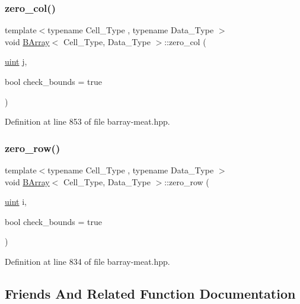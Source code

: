 \subsubsection{\texorpdfstring{zero\+\_\+col()}{zero\_col()}}
{\footnotesize\ttfamily template$<$typename Cell\+\_\+\+Type , typename Data\+\_\+\+Type $>$ \\
void \hyperlink{class_b_array}{B\+Array}$<$ Cell\+\_\+\+Type, Data\+\_\+\+Type $>$\+::zero\+\_\+col (\begin{DoxyParamCaption}\item[{\hyperlink{typedefs_8hpp_a91ad9478d81a7aaf2593e8d9c3d06a14}{uint}}]{j,  }\item[{bool}]{check\+\_\+bounds = {\ttfamily true} }\end{DoxyParamCaption})\hspace{0.3cm}{\ttfamily [inline]}}



Definition at line 853 of file barray-\/meat.\+hpp.

\mbox{\label{class_b_array_a411085fcb7530669c72d9847340f1bac}} 
\subsubsection{\texorpdfstring{zero\+\_\+row()}{zero\_row()}}
{\footnotesize\ttfamily template$<$typename Cell\+\_\+\+Type , typename Data\+\_\+\+Type $>$ \\
void \hyperlink{class_b_array}{B\+Array}$<$ Cell\+\_\+\+Type, Data\+\_\+\+Type $>$\+::zero\+\_\+row (\begin{DoxyParamCaption}\item[{\hyperlink{typedefs_8hpp_a91ad9478d81a7aaf2593e8d9c3d06a14}{uint}}]{i,  }\item[{bool}]{check\+\_\+bounds = {\ttfamily true} }\end{DoxyParamCaption})\hspace{0.3cm}{\ttfamily [inline]}}



Definition at line 834 of file barray-\/meat.\+hpp.



\subsection{Friends And Related Function Documentation}
\mbox{\label{class_b_array_a2cd2ece8a4fc1027d3151b1ec33151cb}} 
